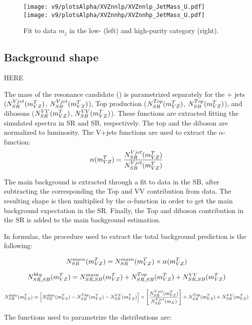 \begin{figure}[!htb]
  \centering
    \texttt{[image: v9/plotsAlpha/XVZnnlp/XVZnnlp\_JetMass\_U.pdf]}
    \texttt{[image: v9/plotsAlpha/XVZnnhp/XVZnnhp\_JetMass\_U.pdf]}
  \caption{Fit to data $m_j$ in the low- (left) and high-purity category (right).}
  \label{fig:XVZnn_JetMass}
\end{figure}








\subsection{Background shape}\label{ssec:alphaShape}

{\color{red} HERE}

The mass of the resonance candidate (\mtVZ) is parametrized separately for the \V + jets ($N_{SR}^{Vjet}(m_{VZ}^T)$, $N_{SB}^{Vjet}(m_{VZ}^T)$), Top production  ($N_{SR}^{Top}(m_{VZ}^T)$, $N_{SB}^{Top}(m_{VZ}^T)$), and dibosons ($N_{SR}^{VV}(m_{VZ}^T)$, $N_{SB}^{VV}(m_{VZ}^T)$). These functions are extracted fitting the simulated \mtVZ spectra in SR and SB, respectively. The top and the diboson are normalized to luminosity. The V+jets functions are used to extract the $\alpha$-function: $$\alpha(m_{VZ}^T) = \frac{N_{SR}^{Vjet}(m_{VZ}^T)}{N_{SB}^{Vjet}(m_{VZ}^T)}$$

The main background is extracted through a fit to data in the SB, after subtracting the corresponding the Top and VV contribution from data. The resulting shape is then multiplied by the $\alpha$-function in order to get the main background expectation in the SR. Finally, the Top and diboson contribution in the SR is added to the main background estimation.

In formulas, the procedure used to extract the total background prediction is the following:

$$N_{SR}^{main}(m_{VZ}^T) = N_{SR}^{main}(m_{VZ}^T) \times \alpha(m_{VZ}^T)$$

$$N_{SR,SB}^{bkg}(m_{VZ}^T) = N_{SR,SB}^{main}(m_{VZ}^T) + N_{SR,SB}^{Top}(m_{VZ}^T) + N_{SR,SB}^{VV}(m_{VZ}^T)$$

$$N_{SR}^{data}(m_{VZ}^T) = \left[ N_{SB}^{data}(m_{VZ}^T) - N_{SB}^{Top}(m_{VZ}^T) - N_{SB}^{VV}(m_{VZ}^T) \right] \times \left[ \frac{N_{SR}^{Vjet}(m_{VZ}^T)}{N_{SB}^{Vjet}(m_{X})} \right]  + N_{SR}^{Top}(m_{VZ}^T) + N_{SR}^{VV}(m_{VZ}^T) $$

The functions used to parametrize the \mtVZ distributions are:

